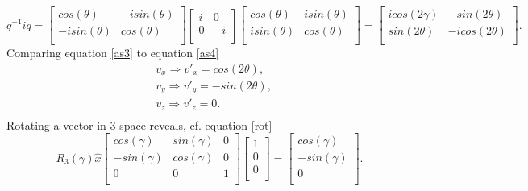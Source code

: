 \begin{equation}
	q^{-1}\hat{i}q=\begin{bmatrix}
		cos(\theta) & -isin(\theta)\\
		-isin(\theta) & cos(\theta)\\
	\end{bmatrix}\begin{bmatrix}
		i & 0\\
		0& -i\\
	\end{bmatrix}\begin{bmatrix}
		cos(\theta) & isin(\theta)\\
		isin(\theta) & cos(\theta)\\
	\end{bmatrix}=\begin{bmatrix}
		icos(2\gamma) & -sin(2\theta)\\
		sin(2\theta) & -icos(2\theta)\\
	\end{bmatrix}.
	\label{as3}
\end{equation} 
Comparing equation \eqref{as3} to equation \eqref{as4}
\begin{equation}
	\begin{split}
		&v_x\Rightarrow v'_x=cos(2\theta),\\
		&v_y\Rightarrow v'_y=-sin(2\theta),\\
		&v_z\Rightarrow v'_z=0.\\
	\end{split}
	\label{as5}
\end{equation} 
Rotating a vector in 3-space reveals, cf. equation \eqref{rot}
\begin{equation}
	R_3(\gamma)\hat{x}
	\begin{bmatrix}
		cos(\gamma) & sin(\gamma) & 0 \\
		-sin(\gamma) & cos(\gamma) & 0\\
		0 & 0 & 1\\
	\end{bmatrix}\begin{bmatrix}
		1\\0 \\0\\
	\end{bmatrix}=\begin{bmatrix}
		cos(\gamma)\\
		-sin(\gamma)\\
		0\\
	\end{bmatrix}.
	\label{as6}
\end{equation} 
